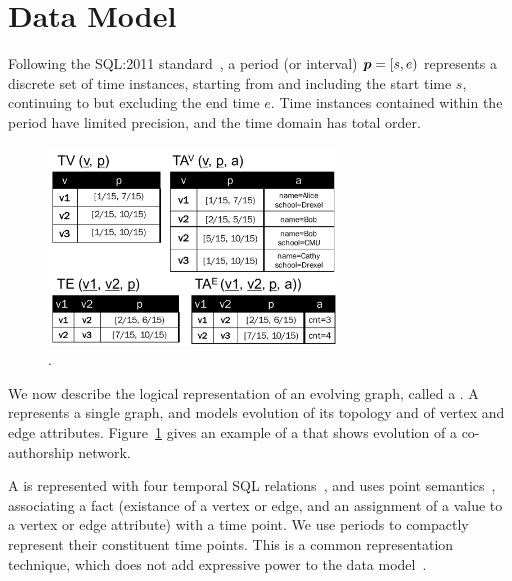 \section{Data Model}
\label{sec:model}

Following the SQL:2011
standard~\cite{DBLP:journals/sigmod/KulkarniM12}, a period (or
interval) $\boldsymbol{p} = [s, e)$ represents a discrete set of time instances,
  starting from and including the start time $s$, continuing to but
  excluding the end time $e$.  Time instances contained within the
  period have limited precision, and the time domain has total order.


\begin{figure}[t!]
\centering
\includegraphics[width=3in]{figs/T1_rel.pdf}
\caption{\tg {}.}
\vspace{-0.5cm}
\label{fig:tg_ve}
\end{figure}

We now describe the logical representation of an evolving graph,
called a \tg.  A \tg represents a single graph, and models evolution
of its topology and of vertex and edge attributes.
Figure~\ref{fig:tg_ve} gives an example of a \tg that shows evolution
of a co-authorship network.

A \tg is represented with four temporal SQL
relations~\cite{DBLP:conf/vldb/BohlenSS96}, and uses point
semantics~\cite{DBLP:reference/db/Toman09}, associating a fact
(existance of a vertex or edge, and an assignment of a value to a
vertex or edge attribute) with a time point.  We use periods to
compactly represent their constituent time points.  This is a common
representation technique, which does not add expressive power to the
data model~\cite{DBLP:conf/ictl/Chomicki94}.

